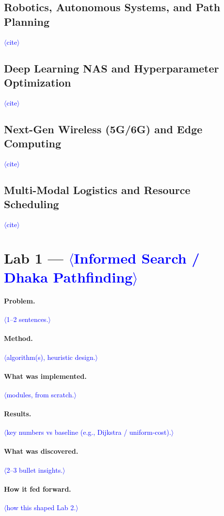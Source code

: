 \documentclass[11pt]{article}
\newcommand{\PH}[1]{\textcolor{blue}{$\langle$#1$\rangle$}}   %
\begin{document}
\subsection{Robotics, Autonomous Systems, and Path Planning}\PH{cite}
\subsection{Deep Learning NAS and Hyperparameter Optimization}\PH{cite}
\subsection{Next-Gen Wireless (5G/6G) and Edge Computing}\PH{cite}
\subsection{Multi-Modal Logistics and Resource Scheduling}\PH{cite}

\section{Lab 1 --- \PH{Informed Search / Dhaka Pathfinding}}
\label{sec:lab1}
\paragraph{Problem.} \PH{1--2 sentences.}
\paragraph{Method.} \PH{algorithm(s), heuristic design.}
\paragraph{What was implemented.} \PH{modules, from scratch.}
\paragraph{Results.} \PH{key numbers vs baseline (e.g., Dijkstra / uniform-cost).}
\paragraph{What was discovered.} \PH{2--3 bullet insights.}
\paragraph{How it fed forward.} \PH{how this shaped Lab 2.}
\end{document}
